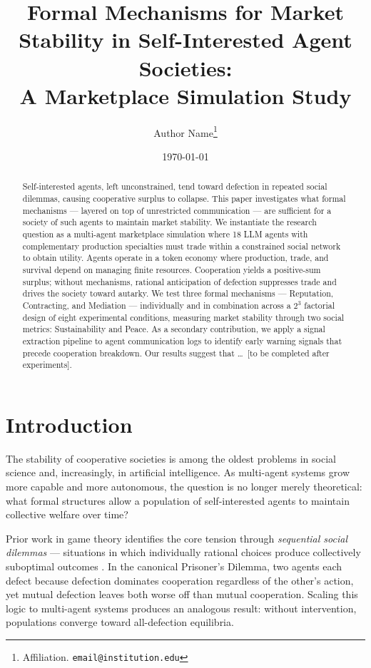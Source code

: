 \documentclass[12pt, a4paper]{article}
\title{\textbf{Formal Mechanisms for Market Stability in Self-Interested Agent Societies:\\
A Marketplace Simulation Study}}
\author{
  Author Name\thanks{Affiliation. \texttt{email@institution.edu}}
}
\date{\today}
\begin{document}

\maketitle

\begin{abstract}
Self-interested agents, left unconstrained, tend toward defection in repeated social dilemmas, causing cooperative surplus to collapse. This paper investigates what formal mechanisms — layered on top of unrestricted communication — are sufficient for a society of such agents to maintain market stability. We instantiate the research question as a multi-agent marketplace simulation where 18 LLM agents with complementary production specialties must trade within a constrained social network to obtain utility. Agents operate in a token economy where production, trade, and survival depend on managing finite resources. Cooperation yields a positive-sum surplus; without mechanisms, rational anticipation of defection suppresses trade and drives the society toward autarky. We test three formal mechanisms — Reputation, Contracting, and Mediation — individually and in combination across a $2^3$ factorial design of eight experimental conditions, measuring market stability through two social metrics: Sustainability and Peace. As a secondary contribution, we apply a signal extraction pipeline to agent communication logs to identify early warning signals that precede cooperation breakdown. Our results suggest that \ldots\ [to be completed after experiments].
\end{abstract}

\tableofcontents
\newpage

\section{Introduction}
\label{sec:introduction}

The stability of cooperative societies is among the oldest problems in social science and, increasingly, in artificial intelligence. As multi-agent systems grow more capable and more autonomous, the question is no longer merely theoretical: what formal structures allow a population of self-interested agents to maintain collective welfare over time?

Prior work in game theory identifies the core tension through \textit{sequential social dilemmas} — situations in which individually rational choices produce collectively suboptimal outcomes \citep{coopeval}. In the canonical Prisoner's Dilemma, two agents each defect because defection dominates cooperation regardless of the other's action, yet mutual defection leaves both worse off than mutual cooperation. Scaling this logic to multi-agent systems produces an analogous result: without intervention, populations converge toward all-defection equilibria.
\end{document}
